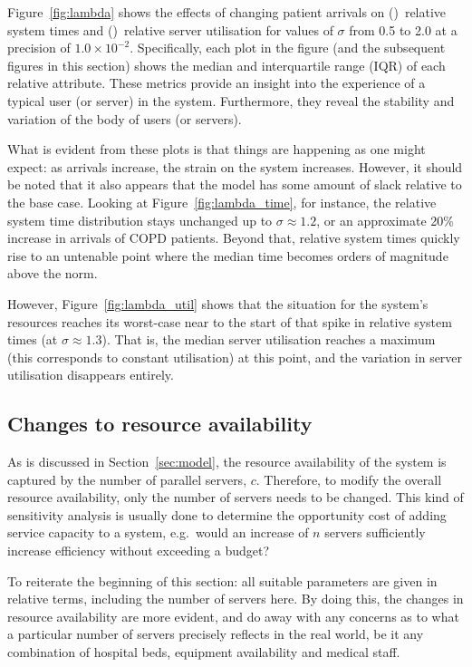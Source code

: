 Figure~\ref{fig:lambda} shows the effects of changing patient arrivals on
()~relative system times and
()~relative server utilisation for values of \(\sigma\)
from 0.5 to 2.0 at a precision of \(1.0 \times 10^{-2}\). Specifically, each
plot in the figure (and the subsequent figures in this section) shows the median
and interquartile range (IQR) of each relative attribute. These metrics provide
an insight into the experience of a typical user (or server) in the system.
Furthermore, they reveal the stability and variation of the body of users
(or servers).

What is evident from these plots is that things are happening as one might
expect: as arrivals increase, the strain on the system increases. However, it
should be noted that it also appears that the model has some amount of slack
relative to the base case. Looking at Figure~\ref{fig:lambda_time}, for
instance, the relative system time distribution stays unchanged up to \(\sigma
\approx 1.2\), or an approximate 20\% increase in arrivals of COPD patients.
Beyond that, relative system times quickly rise to an untenable point where the
median time becomes orders of magnitude above the norm.

However, Figure~\ref{fig:lambda_util} shows that the situation for the system's
resources reaches its worst-case near to the start of that spike in relative
system times (at \(\sigma \approx 1.3\)). That is, the median server utilisation
reaches a maximum (this corresponds to constant utilisation) at this point, and
the variation in server utilisation disappears entirely.


\subsection{Changes to resource availability}\label{subsec:resources}

As is discussed in Section~\ref{sec:model}, the resource availability of the
system is captured by the number of parallel servers, \(c\). Therefore, to
modify the overall resource availability, only the number of servers needs to be
changed. This kind of sensitivity analysis is usually done to determine the
opportunity cost of adding service capacity to a system, e.g.\ would an increase
of \(n\) servers sufficiently increase efficiency without exceeding a budget?

To reiterate the beginning of this section: all suitable parameters are given in
relative terms, including the number of servers here. By doing this, the changes
in resource availability are more evident, and do away with any concerns as to
what a particular number of servers precisely reflects in the real world, be it
any combination of hospital beds, equipment availability and medical staff.

